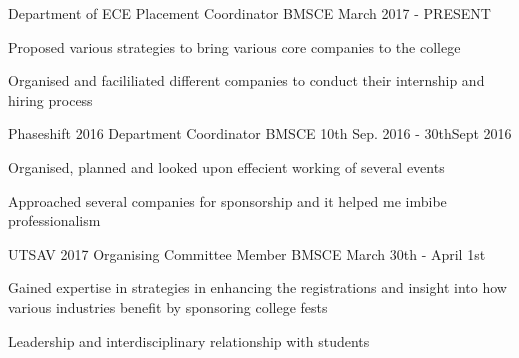 \begin{cventries}
  \cventry
    {Department of ECE}
    {Placement Coordinator}
    {BMSCE}
    {March 2017 - PRESENT}
    {
      \begin{cvitems}
        \item {Proposed various strategies to bring various core companies to the college}
        \item {Organised and facililiated different companies to conduct their internship and hiring process}
      \end{cvitems}
    }
  \cventry
    {Phaseshift 2016}
    {Department Coordinator}
    {BMSCE}
    {10th Sep. 2016 - 30thSept 2016}
    {
      \begin{cvitems}
        \item {Organised, planned and looked upon effecient working of several events}
        \item {Approached several companies for sponsorship and it helped me imbibe professionalism}
      \end{cvitems}
    }
  \cventry
    {UTSAV 2017}
    {Organising Committee Member}
    {BMSCE}
    {March 30th - April 1st}
    {
      \begin{cvitems}
        \item {Gained expertise in strategies in enhancing the registrations and insight into how various industries benefit by sponsoring college fests}
        \item {Leadership and interdisciplinary relationship with students}
      \end{cvitems}
    }
\end{cventries}
